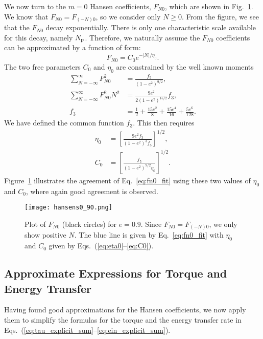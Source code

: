 \documentclass[
        fleqn,
        usenatbib,
    ]{mnras}
\newcommand*{\abs}[1]{\left|#1\right|}
\newcommand*{\p}[1]{\left(#1\right)}
\newcommand*{\s}[1]{\left[#1\right]}
\begin{document}
We now turn to the $m = 0$ Hansen coefficients, $F_{N0}$, which are shown in
Fig.~\ref{fig:fn0_fit}. We know that $F_{N0} = F_{(-N)0}$, so we consider only
$N \geq 0$. From the figure, we see that the $F_{N0}$ decay exponentially. There
is only one characteristic scale available for this decay, namely $N_{\rm p}$.
Therefore, we naturally assume the $F_{N0}$ coefficients can be approximated by
a function of form:
\begin{equation}
    F_{N0} = C_0 e^{-\abs{N} / \eta_0}.\label{eq:fn0_fit}
\end{equation}
The two free parameters $C_0$ and $\eta_0$ are constrained by the well known
moments \citep{hut81}
\begin{align}
    \sum\limits_{N = -\infty}^\infty F_{N0}^2 &= \frac{f_5}{\p{1 - e^2}^{9/2}}
        ,\\
    \sum\limits_{N = -\infty}^\infty F_{N0}^2 N^2
        &= \frac{9e^2}{2\p{1 - e^2}^{15/2}}
            f_3,\\
    f_3 &= \frac{1}{2} + \frac{15e^2}{8} + \frac{15 e^4}{16}
        + \frac{5e^6}{128}.
\end{align}
We have defined the common function $f_3$. This then requires
\begin{align}
    \eta_0 &= \s{\frac{9e^2f_3}{\p{1 - e^2}^{3}f_5}}^{1/2},\label{eq:eta0}\\
    C_0 &= \s{\frac{f_5}{\p{1 - e^2}^{9/2}\eta_0}}^{1/2}.\label{eq:C0}
\end{align}
Figure~\ref{fig:fn0_fit} illustrates the agreement of Eq.~\eqref{eq:fn0_fit}
using these two values of $\eta_0$ and $C_0$, where again good agreement is
observed.
\begin{figure}
    \centering
    \texttt{[image: hansens0\_90.png]}
    \caption{Plot of $F_{N0}$ (black circles) for $e = 0.9$. Since $F_{N0} =
    F_{(-N)0}$, we only show positive $N$. The blue line is given by
    Eq.~\eqref{eq:fn0_fit} with $\eta_0$ and $C_0$ given by
    Eqs.~(\ref{eq:eta0}--\ref{eq:C0}).}\label{fig:fn0_fit}
\end{figure}

\subsection{Approximate Expressions for Torque and Energy Transfer}\label{s:eval}

Having found good approximations for the Hansen coefficients, we now apply them
to simplify the formulas for the torque and the energy transfer rate in
Eqs.~(\ref{eq:tau_explicit_sum}--\ref{eq:ein_explicit_sum}).
\end{document}
